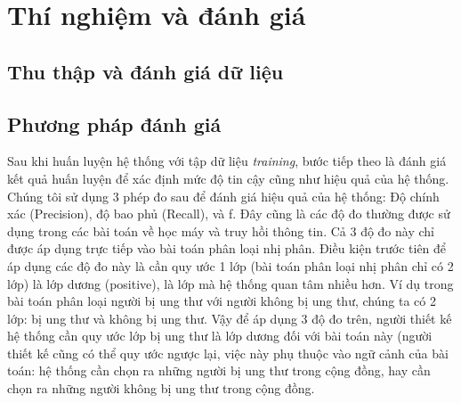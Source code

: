 \section{Thí nghiệm và đánh giá} \label{sec:thi-nghiem-va-danh-gia}
\subsection{Thu thập và đánh giá dữ liệu}
\subsection{Phương pháp đánh giá}
Sau khi huấn luyện hệ thống với tập dữ liệu \textit{training}, bước tiếp theo là đánh giá kết quả huấn luyện để xác định mức độ tin cậy cũng như hiệu quả của hệ thống. Chúng tôi sử dụng 3 phép đo sau để đánh giá hiệu quả của hệ thống: Độ chính xác (Precision), độ bao phủ (Recall), và f. Đây cũng là các độ đo thường được sử dụng trong các bài toán về học máy và truy hồi thông tin. Cả 3 độ đo này chỉ được áp dụng trực tiếp vào bài toán phân loại nhị phân. Điều kiện trước tiên để áp dụng các độ đo này là cần quy ước 1 lớp (bài toán phân loại nhị phân chỉ có 2 lớp) là lớp dương (positive), là lớp mà hệ thống quan tâm nhiều hơn. Ví dụ trong bài toán phân loại người bị ung thư với người không bị ung thư, chúng ta có 2 lớp: bị ung thư và không bị ung thư. Vậy để áp dụng 3 độ đo trên, người thiết kế hệ thống cần quy ước lớp bị ung thư là lớp dương đối với bài toán này (người thiết kế cũng có thể quy ước ngược lại, việc này phụ thuộc vào ngữ cảnh của bài toán: hệ thống cần chọn ra những người bị ung thư trong cộng đồng, hay cần chọn ra những người không bị ung thư trong cộng đồng.

